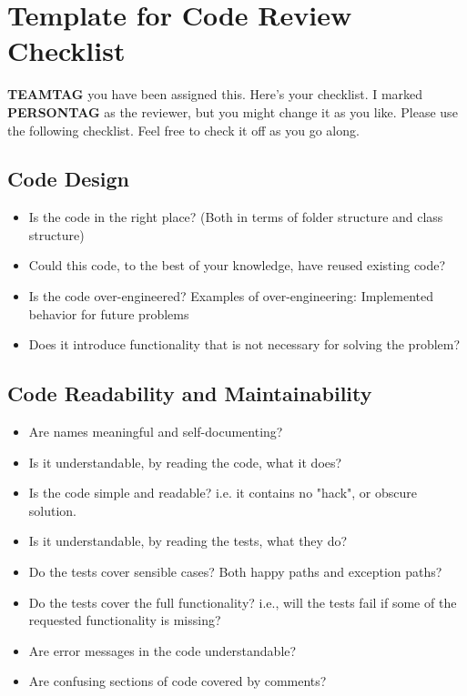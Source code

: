 \chapter{Template for Code Review Checklist} \label{app:code-review-checklist}
\textbf{TEAMTAG} you have been assigned this. Here's your checklist. I
marked \textbf{PERSONTAG} as the reviewer, but you might change it as you
like. Please use the following checklist. Feel free to check it off as
you go along.

\section{Code Design}
\begin{itemize}
\item Is the code in the right place? (Both in terms of folder
 structure and class structure)
\item Could this code, to the best of your knowledge, have reused
 existing code?
\item Is the code over-engineered? Examples of over-engineering:
 Implemented behavior for future problems
\item Does it introduce functionality that is not necessary for
 solving the problem?
\end{itemize}

\section{Code Readability and Maintainability}
\begin{itemize}
\item Are names meaningful and self-documenting?
\item Is it understandable, by reading the code, what it does?
\item Is the code simple and readable? i.e. it contains no "hack",
 or obscure solution.
\item Is it understandable, by reading the tests, what they do?
\item Do the tests cover sensible cases? Both happy paths and
 exception paths?
\item Do the tests cover the full functionality? i.e., will the
 tests fail if some of the requested functionality is missing?
\item Are error messages in the code understandable?
\item Are confusing sections of code covered by comments?
\end{itemize}

